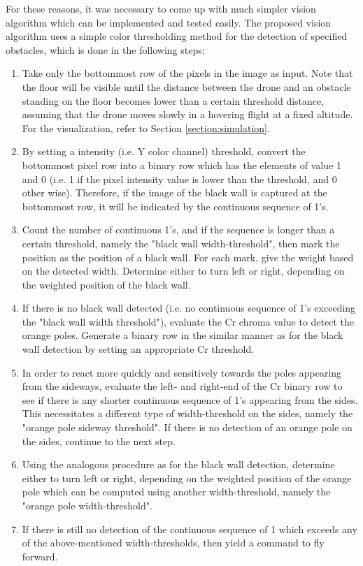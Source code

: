 For these reasons, it was necessary to come up with much simpler vision algorithm which can be implemented and tested easily. The proposed vision algorithm uses a simple color thresholding method for the detection of specified obstacles, which is done in the following steps:
\begin{enumerate}
	\item Take only the bottommost row of the pixels in the image as input. Note that the floor will be visible until the distance between the drone and an obstacle standing on the floor becomes lower than a certain threshold distance, assuming that the drone moves slowly in a hovering flight at a fixed altitude. For the visualization, refer to Section \ref{section:simulation}.
	\item By setting a intensity (i.e. Y color channel)  threshold, convert the bottommost pixel row into a binary row which has the elements of value 1 and 0 (i.e. 1 if the pixel intensity value is lower than the threshold, and 0 other wise). Therefore, if the image of the black wall is captured at the bottommost row, it will be indicated by the continuous sequence of 1's.
	\item Count the number of continuous 1's, and if the sequence is longer than a certain threshold, namely the "black wall width-threshold", then mark the position as the position of a black wall. For each mark, give the weight based on the detected width. Determine either to turn left or right, depending on the weighted position of the black wall. 
	\item If there is no black wall detected (i.e. no continuous sequence of 1's exceeding the "black wall width threshold"), evaluate the Cr chroma value to detect the orange poles. Generate a binary row in the similar manner as for the black wall detection by setting an appropriate Cr threshold. 
	\item In order to react more quickly and sensitively towards the poles appearing from the sideways, evaluate the left- and right-end of the Cr binary row to see if there is any shorter continuous sequence of 1's appearing from the sides. This necessitates a different type of width-threshold on the sides, namely the "orange pole sideway threshold". If there is no detection of an orange pole on the sides, continue to the next step.
	\item Using the analogous procedure as for the black wall detection, determine either to turn left or right, depending on the weighted position of the orange pole which can be computed using another width-threshold, namely the "orange pole width-threshold".
	\item If there is still no detection of the continuous sequence of 1 which exceeds any of the above-mentioned width-thresholds, then yield a command to fly forward.
\end{enumerate}